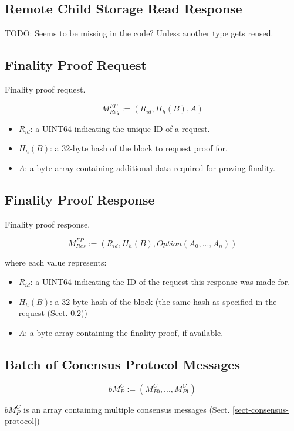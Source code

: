 \documentclass{book}
\newcommand{\todo}[1]{}
\renewcommand{\todo}[1]{{\color{red} TODO: {#1}}}
\begin{document}
\subsection{Remote Child Storage Read Response}

\todo{Seems to be missing in the code? Unless another type gets reused.}

\subsection{Finality Proof Request}\label{sect-finality-proof-request}

Finality proof request.

\[
    M^{FP}_{Req} := (R_{id}, H_h(B), A)
\]

\begin{itemize}
    \item $R_{id}$: a UINT64 indicating the unique ID of a request.
    \item $H_h(B)$: a 32-byte hash of the block to request proof for.
    \item $A$: a byte array containing additional data required for proving finality.
\end{itemize}

\subsection{Finality Proof Response}

Finality proof response.

\[
    M^{FP}_{Res} := (R_{id}, H_h(B), Option(A_0, ..., A_n))
\]

where each value represents:

\begin{itemize}
    \item $R_{id}$: a UINT64 indicating the ID of the request this response was
    made for.
    \item $H_h(B)$: a 32-byte hash of the block (the same hash as specified in the request (Sect. \ref{sect-finality-proof-request}))
    \item $A$: a byte array containing the finality proof, if available.
\end{itemize}

\subsection{Batch of Conensus Protocol Messages}

\[
    bM^C_P := (M^C_{P0}, ..., M^C_{P1})
\]

$bM^C_P$ is an array containing multiple consensus messages (Sect. \ref{sect-consensus-protocol})
\end{document}
